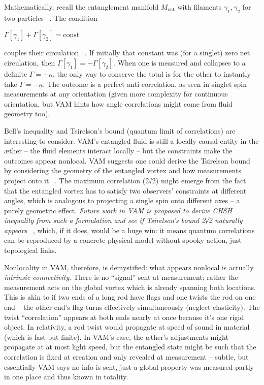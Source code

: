 \documentclass[a4paper, aps,preprint,superscriptaddress, 12pt]{revtex4}
\begin{document}
Mathematically, recall the entanglement manifold $M_{\text{ent}}$ with filaments ${\gamma_1, \gamma_2}$ for two particles~\cite{Iskandarani2025c} . The condition

$\Gamma[\gamma_1] + \Gamma[\gamma_2] = \text{const}$

couples their circulation~\cite{Iskandarani2025c} . If initially that constant was (for a singlet) zero net circulation, then $\Gamma[\gamma_1] = -\Gamma[\gamma_2]$. When one is measured and collapses to a definite $\Gamma = +\kappa$, the only way to conserve the total is for the other to instantly take $\Gamma = -\kappa$. The outcome is a perfect anti-correlation, as seen in singlet spin measurements at any orientation (given more complexity for continuous orientation, but VAM hints how angle correlations might come from fluid geometry too).


Bell’s inequality and Tsirelson’s bound (quantum limit of correlations) are interesting to consider. VAM’s entangled fluid is still a locally causal entity in the æther – the fluid elements interact locally – but the constraints make the outcomes appear nonlocal. VAM suggests one could derive the Tsirelson bound by considering the geometry of the entangled vortex and how measurements project onto it~\cite{Iskandarani2025c} . The maximum correlation (2√2) might emerge from the fact that the entangled vortex has to satisfy two observers’ constraints at different angles, which is analogous to projecting a single spin onto different axes – a purely geometric effect. \textit{Future work in VAM is proposed to derive CHSH inequality from such a formulation and see if Tsirelson’s bound 2√2 naturally appears}~\cite{Iskandarani2025c} , which, if it does, would be a huge win: it means quantum correlations can be reproduced by a concrete physical model without spooky action, just topological links.


Nonlocality in VAM, therefore, is demystified: what appears nonlocal is actually \textit{intrinsic connectivity}. There is no “signal” sent at measurement; rather the measurement acts on the global vortex which is already spanning both locations. This is akin to if two ends of a long rod have flags and one twists the rod on one end – the other end’s flag turns effectively simultaneously (neglect elasticity). The twist “correlation” appears at both ends nearly at once because it’s one rigid object. In relativity, a rod twist would propagate at speed of sound in material (which is fast but finite). In VAM’s case, the æther’s adjustments might propagate at at most light speed, but the entangled state might be such that the correlation is fixed at creation and only revealed at measurement – subtle, but essentially VAM says no info is sent, just a global property was measured partly in one place and thus known in totality.
\end{document}
